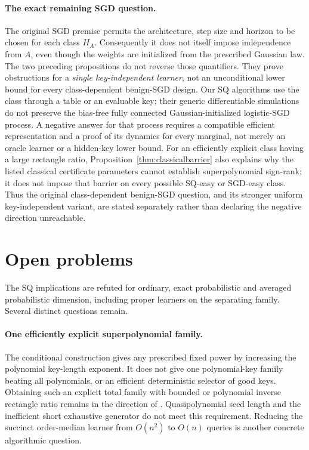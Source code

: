 \documentclass[11pt]{article}
\newcommand{\1}{\mathbf 1}
\begin{document}
\paragraph{The exact remaining SGD question.}
The original SGD premise permits the architecture, step size and horizon to be chosen for each class $H_A$. Consequently it does not itself impose independence from $A$, even though the weights are initialized from the prescribed Gaussian law. The two preceding propositions do not reverse those quantifiers. They prove obstructions for a \emph{single key-independent learner}, not an unconditional lower bound for every class-dependent benign-SGD design. Our SQ algorithms use the class through a table or an evaluable key; their generic differentiable simulations do not preserve the bias-free fully connected Gaussian-initialized logistic-SGD process. A negative answer for that process requires a compatible efficient representation and a proof of its dynamics for every marginal, not merely an oracle learner or a hidden-key lower bound. For an efficiently explicit class having a large rectangle ratio, Proposition~\ref{thm:classicalbarrier} also explains why the listed classical certificate parameters cannot establish superpolynomial sign-rank; it does not impose that barrier on every possible SQ-easy or SGD-easy class. Thus the original class-dependent benign-SGD question, and its stronger uniform key-independent variant, are stated separately rather than declaring the negative direction unreachable.





\clearpage
\section{Open problems}
The SQ implications are refuted for ordinary, exact probabilistic and averaged probabilistic dimension, including proper learners on the separating family. Several distinct questions remain.

\paragraph{One efficiently explicit superpolynomial family.}
The conditional construction gives any prescribed fixed power by increasing the polynomial key-length exponent. It does not give one polynomial-key family beating all polynomials, or an efficient deterministic selector of good keys. Obtaining such an explicit total family with bounded or polynomial inverse rectangle ratio remains in the direction of \citet[Problem~4.1]{HHPTZ22}. Quasipolynomial seed length and the inefficient short exhaustive generator do not meet this requirement. Reducing the succinct order-median learner from $O(n^2)$ to $O(n)$ queries is another concrete algorithmic question.
\end{document}
